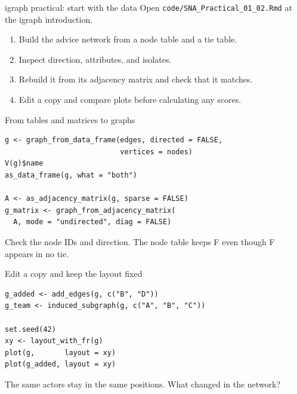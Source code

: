 \documentclass[aspectratio=169,11pt]{beamer}
\begin{document}
\begin{frame}{igraph practical: start with the data}
Open \texttt{code/SNA\_Practical\_01\_02.Rmd} at the igraph introduction.
\begin{enumerate}
\item Build the advice network from a node table and a tie table.
\item Inspect direction, attributes, and isolates.
\item Rebuild it from its adjacency matrix and check that it matches.
\item Edit a copy and compare plots before calculating any scores.
\end{enumerate}
\end{frame}

\begin{frame}[fragile]{From tables and matrices to graphs}
\begin{lstlisting}
g <- graph_from_data_frame(edges, directed = FALSE,
                           vertices = nodes)
V(g)$name
as_data_frame(g, what = "both")

A <- as_adjacency_matrix(g, sparse = FALSE)
g_matrix <- graph_from_adjacency_matrix(
  A, mode = "undirected", diag = FALSE)
\end{lstlisting}
Check the node IDs and direction. The node table keeps F even though F appears in no tie.
\end{frame}

\begin{frame}[fragile]{Edit a copy and keep the layout fixed}
\begin{lstlisting}
g_added <- add_edges(g, c("B", "D"))
g_team <- induced_subgraph(g, c("A", "B", "C"))

set.seed(42)
xy <- layout_with_fr(g)
plot(g,       layout = xy)
plot(g_added, layout = xy)
\end{lstlisting}
The same actors stay in the same positions. What changed in the network?
\end{frame}
\end{document}
